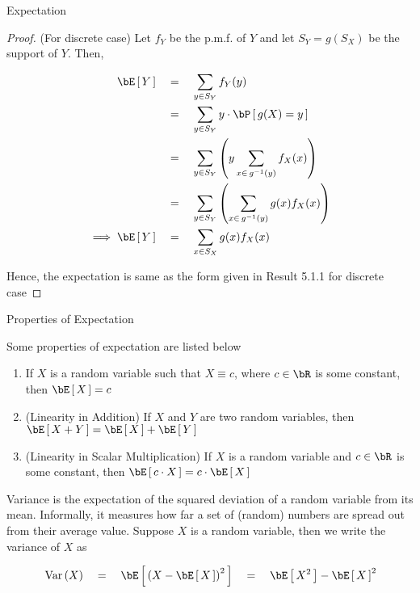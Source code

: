\documentclass{article}
\begin{document}
\begin{ssection}{Expectation}
	\begin{proof} (For discrete case)
		Let $f_Y$ be the p.m.f. of $Y$ and let $S_Y = g(S_X)$ be the support of $Y$. Then,

		\begin{align*}
			\E{Y}			&\eq	\sum_{y \in S_Y} f_Y(y) \\
							&\eq	\sum_{y \in S_Y} y \cdot \prob{g(X) = y} \\
							&\eq	\sum_{y \in S_Y} \para{y \sum_{x \in \funcinv{g}{y}} f_X(x)} \\
							&\eq	\sum_{y \in S_Y} \para{\sum_{x \in \funcinv{g}{y}} g(x) f_X(x)} \\
			\implies \E{Y}	&\eq	\sum_{x \in S_X} g(x) f_X(x) \\
		\end{align*}

		Hence, the expectation is same as the form given in Result 5.1.1 for discrete case
	\end{proof}


	\begin{ssubsection}{Properties of Expectation}

		Some properties of expectation are listed below

		\begin{enumerate}[label=\textbf{\theenumi.} ]
			\item If $X$ is a random variable such that $X \equiv c$, where $c \in \bR$ is some constant, then $\E{X} = c$
			\item (Linearity in Addition) If $X$ and $Y$ are two random variables, then $\E{X + Y} = \E{X} + \E{Y}$
			\item (Linearity in Scalar Multiplication) If $X$ is a random variable and $c \in \bR$ is some constant, then $\E{c \cdot X} = c \cdot \E{X}$
		\end{enumerate}

	\end{ssubsection}

	\begin{definition}[Variance]
		Variance is the expectation of the squared deviation of a random variable from its mean. Informally, it measures how far a set of (random) numbers are spread out from their average value. Suppose $X$ is a random variable, then we write the variance of $X$ as

		\begin{align*}
			\var{X}	\eq		\E{\para{X - \E{X}}^2}	\eq	\E{X^2} - \E{X}^2
		\end{align*}
	\end{definition}

\end{ssection}
\end{document}
